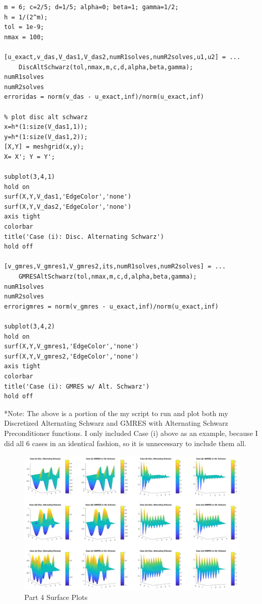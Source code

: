 \documentclass[12pt]{article}
\begin{document}
\newpage
\lstset{language=matlab,frame=single}
\begin{lstlisting}[caption=Part 4 Example Run]
% case (i):
m = 6; c=2/5; d=1/5; alpha=0; beta=1; gamma=1/2;
h = 1/(2^m);
tol = 1e-9;
nmax = 100;

[u_exact,v_das,V_das1,V_das2,numR1solves,numR2solves,u1,u2] = ...
    DiscAltSchwarz(tol,nmax,m,c,d,alpha,beta,gamma);
numR1solves
numR2solves
erroridas = norm(v_das - u_exact,inf)/norm(u_exact,inf)

% plot disc alt schwarz
x=h*(1:size(V_das1,1));
y=h*(1:size(V_das1,2));
[X,Y] = meshgrid(x,y);
X= X'; Y = Y';

subplot(3,4,1)
hold on
surf(X,Y,V_das1,'EdgeColor','none')
surf(X,Y,V_das2,'EdgeColor','none')
axis tight
colorbar
title('Case (i): Disc. Alternating Schwarz')
hold off

[v_gmres,V_gmres1,V_gmres2,its,numR1solves,numR2solves] = ...
    GMRESAltSchwarz(tol,nmax,m,c,d,alpha,beta,gamma);
numR1solves
numR2solves
errorigmres = norm(v_gmres - u_exact,inf)/norm(u_exact,inf)

subplot(3,4,2)
hold on
surf(X,Y,V_gmres1,'EdgeColor','none')
surf(X,Y,V_gmres2,'EdgeColor','none')
axis tight
colorbar
title('Case (i): GMRES w/ Alt. Schwarz')
hold off
\end{lstlisting}
*Note: The above is a portion of the my script to run and plot both my Discretized Alternating Schwarz and GMRES with Alternating Schwarz Preconditioner functions.  I only included Case (i) above as an example, because I did all 6 cases in an identical fashion, so it is unnecessary to include them all.

\begin{figure}[H]
\hspace{-.87in}
\includegraphics[scale=.23]{Part4_graphs.jpg}
\caption{Part 4 Surface Plots}
\end{figure}
\end{document}
